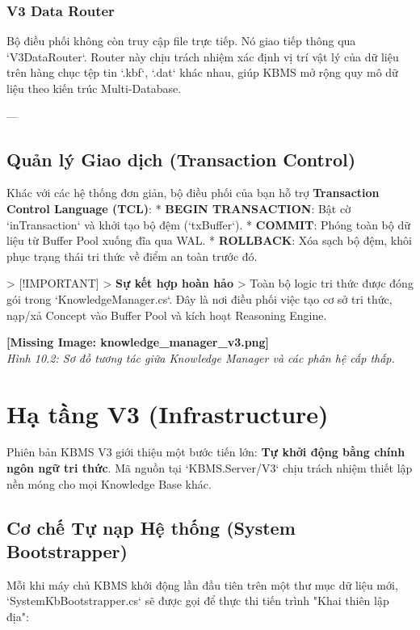 \subsubsection{V3 Data Router}
Bộ điều phối không còn truy cập file trực tiếp. Nó giao tiếp thông qua `V3DataRouter`. Router này chịu trách nhiệm xác định vị trí vật lý của dữ liệu trên hàng chục tệp tin `.kbf`, `.dat` khác nhau, giúp KBMS mở rộng quy mô dữ liệu theo kiến trúc Multi-Database.

---

\subsection{Quản lý Giao dịch (Transaction Control)}

Khác với các hệ thống đơn giản, bộ điều phối của bạn hỗ trợ \textbf{Transaction Control Language (TCL)}:
*   \textbf{BEGIN TRANSACTION}: Bật cờ `inTransaction` và khởi tạo bộ đệm (`txBuffer`).
*   \textbf{COMMIT}: Phóng toàn bộ dữ liệu từ Buffer Pool xuống đĩa qua WAL. 
*   \textbf{ROLLBACK}: Xóa sạch bộ đệm, khôi phục trạng thái tri thức về điểm an toàn trước đó.

> [!IMPORTANT]
> \textbf{Sự kết hợp hoàn hảo}
> Toàn bộ logic tri thức được đóng gói trong `KnowledgeManager.cs`. Đây là nơi điều phối việc tạo cơ sở tri thức, nạp/xả Concept vào Buffer Pool và kích hoạt Reasoning Engine.

\textbf{[Missing Image: knowledge_manager_v3.png]}\\ \textit{Hình 10.2: Sơ đồ tương tác giữa Knowledge Manager và các phân hệ cấp thấp.}

\section{Hạ tầng V3 (Infrastructure)}

Phiên bản KBMS V3 giới thiệu một bước tiến lớn: \textbf{Tự khởi động bằng chính ngôn ngữ tri thức}. Mã nguồn tại `KBMS.Server/V3` chịu trách nhiệm thiết lập nền móng cho mọi Knowledge Base khác.

\subsection{Cơ chế Tự nạp Hệ thống (System Bootstrapper)}

Mỗi khi máy chủ KBMS khởi động lần đầu tiên trên một thư mục dữ liệu mới, `SystemKbBootstrapper.cs` sẽ được gọi để thực thi tiến trình "Khai thiên lập địa":

